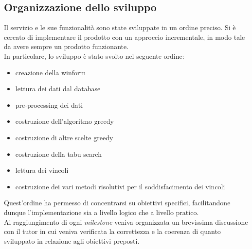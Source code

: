 \subsection{Organizzazione dello sviluppo}
\label{sec:organizzazione-sviluppo}
\noindent Il servizio e le sue funzionalità sono state sviluppate in un
ordine preciso. Si è cercato di implementare il prodotto
con un approccio incrementale, in modo tale da avere
sempre un prodotto funzionante.\\
In particolare, lo sviluppo è stato svolto nel seguente ordine:
\begin{itemize}
    \item creazione della winform
    \item lettura dei dati dal database
    \item pre-processing dei dati
    \item costruzione dell'algoritmo greedy
    \item costruzione di altre scelte greedy
    \item costruzione della tabu search
    \item lettura dei vincoli
    \item costruzione dei vari metodi risolutivi
    per il soddisfacimento dei vincoli
\end{itemize}

\noindent Quest'ordine ha permesso di concentrarsi su obiettivi specifici,
facilitandone dunque l'implementazione sia a livello logico che a livello pratico.\\

\noindent Al raggiungimento di ogni \textit{milestone} veniva
organizzata un brevissima discussione con il tutor
in cui veniva verificata la correttezza e la coerenza di quanto
sviluppato in relazione agli obiettivi preposti.
